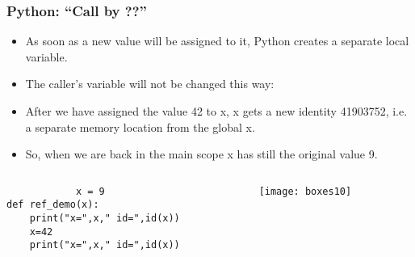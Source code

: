 \begin{frame}[fragile]\frametitle{Python: ``Call by ??'' }
    \begin{itemize}
    \item As soon as a new value will be assigned to it, Python creates a separate local variable. 
    \item The caller's variable will not be changed this way: 
        \item After we have assigned the value 42 to x, x gets a new identity 41903752, i.e. a separate memory location from the global x. 
        \item  So, when we are back in the main scope x has still the original value 9. 
            \end{itemize}
  \begin{columns}[c]
    \begin{column}{0.5\linewidth}

            \begin{lstlisting}
            x = 9
def ref_demo(x):
    print("x=",x," id=",id(x))
    x=42
    print("x=",x," id=",id(x))
\end{lstlisting}

      \end{column}
    \begin{column}{0.4\linewidth}
    \begin{center}
\texttt{[image: boxes10]}
\end{center}
        \end{column}
  \end{columns}
  
   \end{frame}
   
